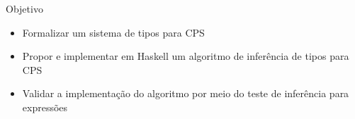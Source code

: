 \begin{frame}{Objetivo}
    \begin{itemize}
        \item Formalizar um sistema de tipos para CPS
        \item Propor e implementar em Haskell um algoritmo de inferência de tipos para CPS
        \item Validar a implementação do algoritmo por meio do teste de inferência para expressões
    \end{itemize}
\end{frame}